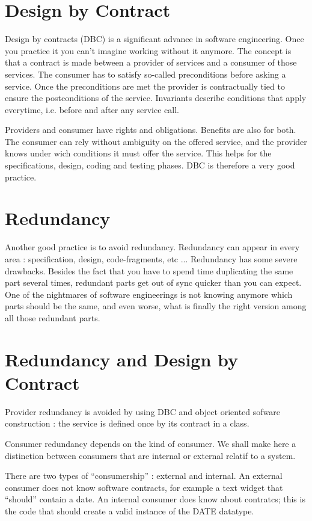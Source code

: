 \documentclass{article}
\begin{document}
\section {Design by Contract}
Design by contracts (DBC) is a significant advance in software engineering. Once you practice it you can't imagine working without it anymore. The concept is that a contract is made between a provider of services and a consumer of those services. The consumer has to satisfy so-called preconditions before asking a service. Once the preconditions are met the provider is contractually tied to ensure the postconditions of the service.  Invariants describe conditions that apply everytime, i.e. before and after any service call.

Providers and consumer have rights and obligations. Benefits are also for both. The consumer can rely without ambiguity on the offered service, and the provider knows under wich conditions it must offer the service. This helps for the specifications, design, coding and testing phases. DBC is therefore a very good practice.
\section {Redundancy}
Another good practice is to avoid redundancy. Redundancy can appear in every area : specification, design, code-fragments, etc ... Redundancy has some severe drawbacks. Besides the fact that you have to spend time duplicating the same part several times, redundant parts get out of sync quicker than you can expect. One of the nightmares of software engineerings is not knowing anymore which parts should be the same, and even worse, what is finally the right version among all those redundant parts.
\section {Redundancy and Design by Contract}
Provider redundancy is avoided by using DBC and object oriented sofware construction : the service is defined once by its contract in a class. 

Consumer redundancy depends on the kind of consumer. We shall make here a distinction between consumers that are internal or external relatif to a system.

There are two types of ``consumership'' : external and internal.
An external consumer does not know software contracts, for example a text widget that ``should'' contain a date.  An internal consumer does know about contratcs; this is the code that should create a valid instance of the DATE datatype.
\end{document}
